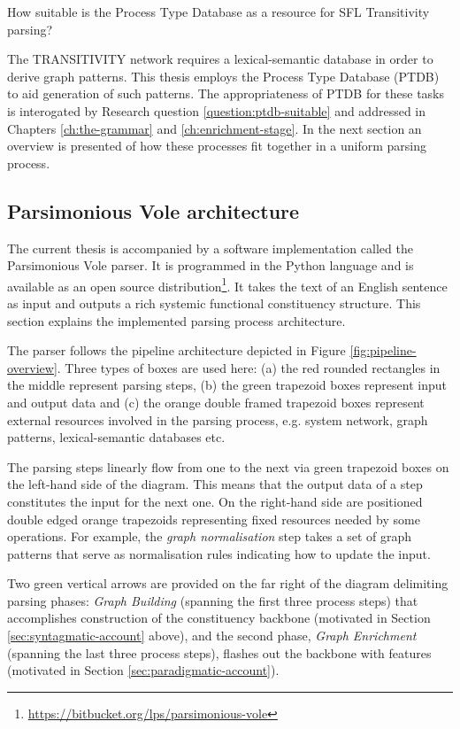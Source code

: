 \begin{question}\label{question:ptdb-suitable}
    How suitable is the Process Type Database as a resource for SFL Transitivity parsing? 
\end{question}


The TRANSITIVITY network requires a lexical-semantic database in order to derive graph patterns. This thesis employs the Process Type Database (PTDB) \citep{Neale2002} to aid generation of such patterns. The appropriateness of PTDB for these tasks is interogated by Research question \ref{question:ptdb-suitable} and addressed in Chapters \ref{ch:the-grammar} and \ref{ch:enrichment-stage}. In the next section an overview is presented of how these processes fit together in a uniform parsing process.

\subsection{Parsimonious Vole architecture}
\label{sec:architecture}
The current thesis is accompanied by a software implementation called the Parsimonious Vole parser. It is programmed in the Python language and is available as an open source distribution\footnote{\url{https://bitbucket.org/lps/parsimonious-vole}}. It takes the text of an English sentence as input and outputs a rich systemic functional constituency structure. This section explains the implemented parsing process architecture.

The parser follows the pipeline architecture depicted in Figure \ref{fig:pipeline-overview}. Three types of boxes are used here: (a) the red rounded rectangles in the middle represent parsing steps, (b) the green trapezoid boxes represent input and output data and (c) the orange double framed trapezoid boxes represent external resources involved in the parsing process, e.g. system network, graph patterns, lexical-semantic databases etc. 

The parsing steps linearly flow from one to the next via green trapezoid boxes on the left-hand side of the diagram. This means that the output data of a step constitutes the input for the next one. On the right-hand side are positioned double edged orange trapezoids representing fixed resources needed by some operations. For example, the \textit{graph normalisation} step takes a set of graph patterns that serve as normalisation rules indicating how to update the input.

Two green vertical arrows are provided on the far right of the diagram delimiting parsing phases: \textit{Graph Building} (spanning the first three process steps) that accomplishes construction of the constituency backbone (motivated in Section \ref{sec:syntagmatic-account} above), and the second phase, \textit{Graph Enrichment} (spanning the last three process steps), flashes out the backbone with features (motivated in Section \ref{sec:paradigmatic-account}).

